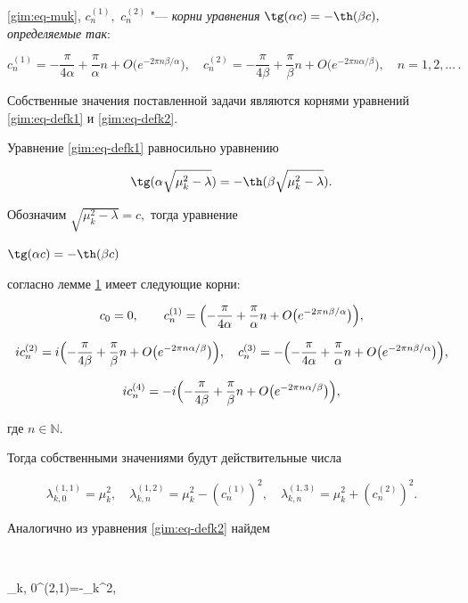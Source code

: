 \eqref{gim:eq-muk}, $c_n^{(1)},$ $c_n^{(2)}$ "--- {\it корни уравнения $\tg(\alpha c)=-\th(\beta c),$ определяемые так}:

$$ c_n^{(1)}=-\frac{\pi}{4\alpha}+\frac{\pi}{\alpha}n+O\big(e^{-2\pi n \beta/\alpha}\big),

\quad 

c_n^{(2)}=-\frac{\pi}{4\beta}+\frac{\pi}{\beta}n+O\big(e^{-2\pi n \alpha/\beta}\big),\quad n=1, 2, \dots\,.$$



\smallskip

\proof

Собственные значения поставленной задачи являются корнями уравнений \eqref{gim:eq-defk1} и \eqref{gim:eq-defk2}.

Уравнение \eqref{gim:eq-defk1} равносильно уравнению

$$\tg(\alpha\sqrt{\mu_k^2-\lambda})=-\th(\beta\sqrt{\mu_k^2-\lambda}).$$

Обозначим $\sqrt{\mu^2_k-\lambda}=c,$ тогда уравнение

$\tg (\alpha c)=-\th (\beta c)$

согласно лемме \hyperlink{gim:l1}{1} имеет следующие корни:

$$

c_0=0,\qquad 

c_n^{(1)}=\Bigl(-\frac{\pi}{4\alpha}+\frac{\pi}{\alpha}n+O\big(e^{-2\pi n\beta/\alpha}\big)\Bigr),$$

$$ ic_n^{(2)}=i\Bigl(-\frac{\pi}{4\beta}+\frac{\pi}{\beta}n+O\big(e^{-2\pi n\alpha/\beta}\big)\Bigr),\quad 

c_n^{(3)}=-\Bigl(-\frac{\pi}{4\alpha}+\frac{\pi}{\alpha}n+O\big(e^{-2\pi n\beta/\alpha}\big)\Bigr),$$

$$ic_n^{(4)}=- i\Bigl(-\frac{\pi}{4\beta}+\frac{\pi}{\beta}n+O\big(e^{-2\pi n\alpha/\beta}\big)\Bigr),$$

где $n\in \mathbb{N}.$

Тогда собственными значениями будут действительные числа 

$$

\lambda_{k, 0}^{(1,1)}=\mu_k^2,\quad 

\lambda_{k, n}^{(1,2)}=\mu_k^2- (c_n^{(1)} )^2,\quad 

\lambda_{k ,n}^{(1,3)}=\mu_k^2+(c_n^{(2)})^2.$$

Аналогично из уравнения \eqref{gim:eq-defk2} найдем

$$

\lambda_{k, 0}^{(2,1)}=-\mu_k^2,\quad 

